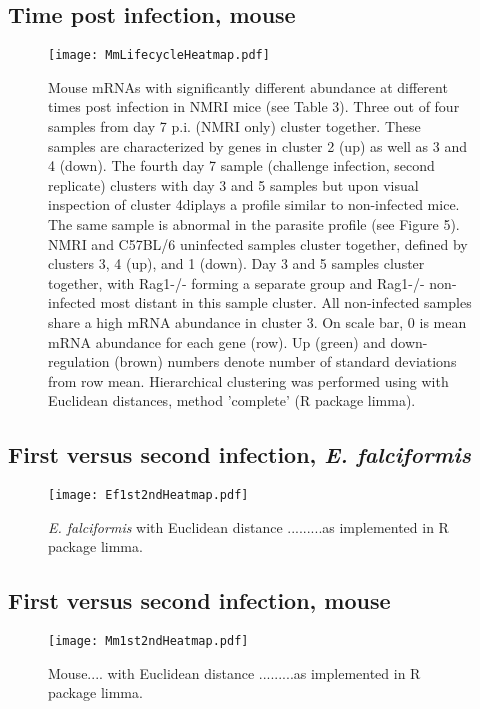 \documentclass{article}
\begin{document}
\subsection{Time post infection, mouse}
\begin{figure}[H]
\centering
\texttt{[image: MmLifecycleHeatmap.pdf]}  
\caption{Mouse mRNAs with significantly different abundance at different times post infection in NMRI mice (see Table 3).
Three out of four samples from day 7 p.i. (NMRI only) cluster together. These samples are characterized by genes in cluster 2 (up) as well as 3 and 4 (down). The fourth day 7 sample (challenge infection, second replicate) clusters with day 3 and 5 samples but upon visual inspection of cluster 4diplays a profile similar to non-infected mice. The same sample is abnormal in the parasite profile (see Figure 5). NMRI and C57BL/6 uninfected samples cluster together, defined by clusters 3, 4 (up), and 1 (down). Day 3 and 5 samples cluster together, with Rag1-/- forming a separate group and Rag1-/- non-infected most distant in this sample cluster. All non-infected samples share a high mRNA abundance in cluster 3. On scale bar, 0 is mean mRNA abundance for each gene (row). Up (green) and down-regulation (brown) numbers denote number of standard deviations from row mean. Hierarchical clustering was performed using with Euclidean distances, method 'complete' (R package limma).}
\end{figure}

\subsection{First versus second infection, \textit{E. falciformis}}
\begin{figure}[H]
\begin{center}
\texttt{[image: Ef1st2ndHeatmap.pdf]}  
	\caption{\textit{E. falciformis} with Euclidean distance .........as implemented in R package limma.}
\end{center}
\end{figure}

\subsection{First versus second infection, mouse}
\begin{figure}[H]
\begin{center}
\texttt{[image: Mm1st2ndHeatmap.pdf]}  
	\caption{Mouse.... with Euclidean distance .........as implemented in R package limma.}
\end{center}
\end{figure}
\end{document}
